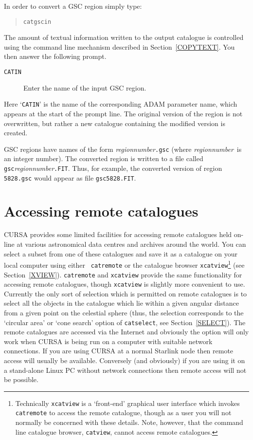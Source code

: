 \documentclass[twoside,11pt]{article}
\newcommand{\xlabel}[1]{}
\renewcommand{\_}{\texttt{\symbol{95}}}
\begin{document}
In order to convert a GSC region simply type:

\begin{verse}
{\tt catgscin}
\end{verse}

The amount of textual
information written to the output catalogue is controlled using the
command line mechanism described in Section~\ref{COPYTEXT}.
You then answer the following prompt.

\begin{description}

  \item[ {\tt CATIN} ] Enter the name of the input GSC region.

\end{description}

Here `{\tt CATIN}' is the name of the corresponding ADAM parameter name,
which appears at the start of the prompt line.  The original version of
the region is not overwritten, but rather a new catalogue containing the
modified version is created.

GSC regions have names of the form {\it region\_number}{\tt .gsc} (where
{\it region\_number}\, is an integer number).  The converted region is
written to a file called {\tt gsc}{\it region\_number}{\tt .FIT}. Thus,
for example, the converted version of region {\tt 5828.gsc} would appear
as file {\tt gsc5828.FIT}.


\section{\xlabel{REMACCSS}\label{REMACCSS}Accessing remote catalogues}

CURSA provides some limited facilities for accessing remote catalogues
held on-line at various astronomical data centres and archives around
the world.  You can select a subset from one of these catalogues and
save it as a catalogue on your local computer using either {\tt
catremote} or the catalogue browser {\tt xcatview}\footnote{Technically
{\tt xcatview} is a `front-end' graphical user interface which invokes
{\tt catremote} to access the remote catalogue, though as a user you
will not normally be concerned with these details.  Note, however,
that the command line catalogue browser, {\tt catview}, cannot access
remote catalogues.} (see Section~\ref{XVIEW}).  {\tt catremote} and
{\tt xcatview} provide the same functionality for accessing remote
catalogues, though {\tt xcatview} is slightly more convenient to use.
Currently the only sort of selection which is permitted on remote
catalogues is to select all the objects in the catalogue which lie
within a given angular distance from a given point on the celestial
sphere (thus, the selection corresponds to the `circular area' or
`cone search' option of {\tt catselect}, see Section~\ref{SELECT}).
The remote catalogues are accessed via the Internet and obviously the
option will only work when CURSA is being run on a computer with suitable
network connections.  If you are using CURSA at a normal Starlink node
then remote access will usually be available.  Conversely (and obviously)
if you are using it on a stand-alone Linux PC without network connections
then remote access will not be possible.
\end{document}

